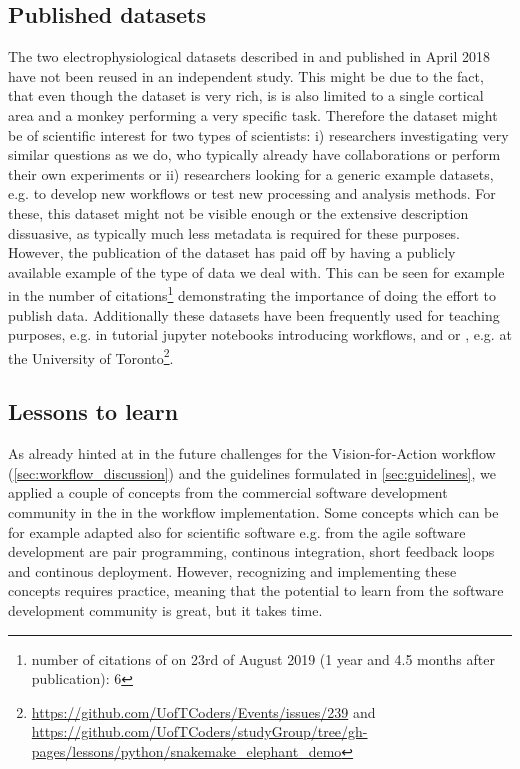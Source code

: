 \subsection{Published datasets}
The two electrophysiological datasets described in \citep{Brochier_2018} and published in April 2018 have not been reused in an independent study. This might be due to the fact, that even though the dataset is very rich, is is also limited to a single cortical area and a monkey performing a very specific task. Therefore the dataset might be of scientific interest for two types of scientists: i) researchers investigating very similar questions as we do, who typically already have collaborations or perform their own experiments or ii) researchers looking for a generic example datasets, e.g. to develop new workflows or test new processing and analysis methods. For these, this dataset might not be visible enough or the extensive description dissuasive, as typically much less metadata is required for these purposes. However, the publication of the dataset has paid off by having a publicly available example of the type of data we deal with. This can be seen for example in the number of citations\footnote{number of citations of \citep{Brochier_2018} on 23rd of August 2019 (1 year and 4.5 months after publication): 6} demonstrating the importance of doing the effort to publish data. Additionally these datasets have been frequently used for teaching purposes, e.g. in tutorial jupyter notebooks introducing  workflows,  and or , e.g. at the University of Toronto\footnote{\url{https://github.com/UofTCoders/Events/issues/239} and \url{https://github.com/UofTCoders/studyGroup/tree/gh-pages/lessons/python/snakemake_elephant_demo}}.

\subsection{Lessons to learn}
As already hinted at in the future challenges for the Vision-for-Action workflow (\cref{sec:workflow_discussion}) and the guidelines formulated in \cref{sec:guidelines}, we applied a couple of concepts from the commercial  software development community in the in the workflow implementation. Some concepts which can be for example adapted also for scientific software e.g. from the agile software development are pair programming, continous integration, short feedback loops and continous deployment. However, recognizing and implementing these concepts requires practice, meaning that the potential to learn from the software development community is great, but it takes time.

